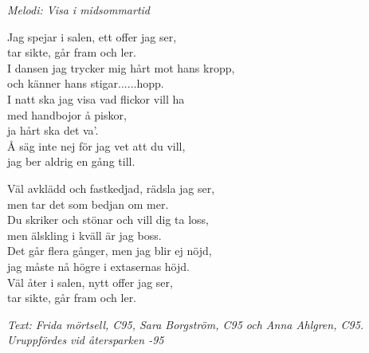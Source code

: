 {\footnotesize\textit{Melodi: Visa i midsommartid}}\par
\vspace{10pt}
Jag spejar i salen, ett offer jag ser,\\
tar sikte, går fram och ler.\\
I dansen jag trycker mig hårt mot hans kropp,\\
och känner hans stigar......hopp.\\
I natt ska jag visa vad flickor vill ha\\
med handbojor å piskor,\\
ja hårt ska det va'.\\
Å säg inte nej för jag vet att du vill,\\
jag ber aldrig en gång till.\par
\vspace{10pt}
Väl avklädd och fastkedjad, rädsla jag ser,\\
men tar det som bedjan om mer.\\
Du skriker och stönar och vill dig ta loss,\\
men älskling i kväll är jag boss.\\
Det går flera gånger, men jag blir ej nöjd,\\
jag måste nå högre i extasernas höjd.\\
Väl åter i salen, nytt offer jag ser,\\
tar sikte, går fram och ler.
\par
\vspace{10pt}
{\footnotesize\textit{Text: Frida mörtsell, C95, Sara Borgström, C95 och Anna Ahlgren, C95. \\
					 Uruppfördes vid återsparken -95}}
